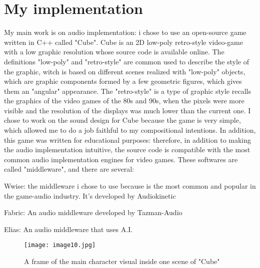 
\chapter{My implementation}
\label{chp:fundamentals}

My main work is on audio implementation: i chose to use an open-source game written in C++ called "Cube".
Cube is an 2D low-poly retro-style video-game with a low graphic resolution whose source code is available online. The definitions "low-poly" and "retro-style" are common used to describe the style of the graphic, witch is based on different scenes realized with "low-poly" objects, which are graphic components formed by a few geometric figures, which gives them an "angular" appearance. The "retro-style" is a type of graphic style recalls the graphics of the video games of the 80s and 90s, when the pixels were more visible and the resolution of the displays was much lower than the current one.
I chose to work on the sound design for Cube because the game is very simple, which allowed me to do a job faithful to my compositional intentions. In addition, this game was written for educational purposes: therefore, in addition to making the audio implementation intuitive, the source code is compatible with the most common audio implementation engines for video games. These softwares are called "middleware", and there are several:

\begin{compactitem}
	\item Wwise: the middleware i chose to use because is the most common and popular in the game-audio industry. It's developed by Audiokinetic
	\item Fabric: An audio middleware developed by Tazman-Audio
	\item Elias: An audio middleware that uses A.I.
\end{compactitem}

\begin{figure}[h]
	\begin{center}
		\texttt{[image: image10.jpg]}
		\caption{A frame of the main character visual inside one scene of "Cube"}
	\end{center}
\end{figure}

